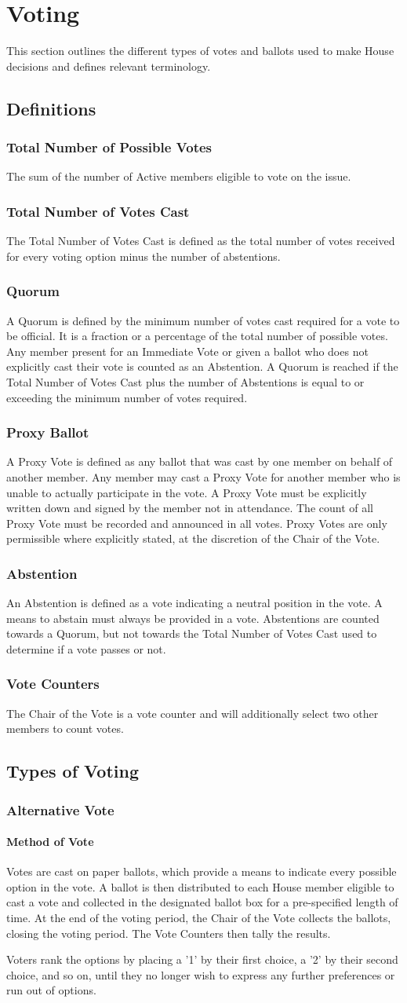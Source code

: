 \documentclass{article}
\newcommand{\article}[1]{\section{#1} \label{#1}}
\newcommand{\asection}[1]{\subsection{#1} \label{#1}}
\newcommand{\asubsection}[1]{\subsubsection{#1} \label{#1}}
\newcommand{\asubsubsection}[1]{\paragraph{#1} \label{#1}}
\begin{document}
\article{Voting}
This section outlines the different types of votes and ballots used to make House decisions and defines relevant terminology.
\asection{Definitions}
\asubsection{Total Number of Possible Votes}
The sum of the number of Active members eligible to vote on the issue.
\asubsection{Total Number of Votes Cast}
The Total Number of Votes Cast is defined as the total number of votes received for every voting option minus the number of abstentions.
\asubsection{Quorum}
A Quorum is defined by the minimum number of votes cast required for a vote to be official.
It is a fraction or a percentage of the total number of possible votes.
Any member present for an Immediate Vote or given a ballot who does not explicitly cast their vote is counted as an Abstention.
A Quorum is reached if the Total Number of Votes Cast plus the number of Abstentions is equal to or exceeding the minimum number of votes required.
\asubsection{Proxy Ballot}
A Proxy Vote is defined as any ballot that was cast by one member on behalf of another member.
Any member may cast a Proxy Vote for another member who is unable to actually participate in the vote.
A Proxy Vote must be explicitly written down and signed by the member not in attendance.
The count of all Proxy Vote must be recorded and announced in all votes.
Proxy Votes are only permissible where explicitly stated, at the discretion of the Chair of the Vote.
\asubsection{Abstention}
An Abstention is defined as a vote indicating a neutral position in the vote.
A means to abstain must always be provided in a vote.
Abstentions are counted towards a Quorum, but not towards the Total Number of Votes Cast used to determine if a vote passes or not.
\asubsection{Vote Counters}
The Chair of the Vote is a vote counter and will additionally select two other members to count votes.

\asection{Types of Voting}
\asubsection{Alternative Vote}
\asubsubsection{Method of Vote}
Votes are cast on paper ballots, which provide a means to indicate every possible option in the vote.
A ballot is then distributed to each House member eligible to cast a vote and collected in the designated ballot box for a pre-specified length of time.
At the end of the voting period, the Chair of the Vote collects the ballots, closing the voting period.
The Vote Counters then tally the results.

Voters rank the options by placing a '1' by their first choice, a '2' by their second choice, and so on, until they no longer wish to express any further preferences or run out of options.
\end{document}
